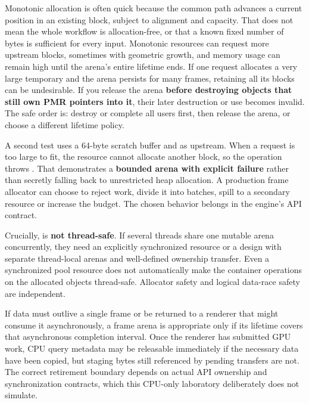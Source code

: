 Monotonic allocation is often quick because the common path advances a current position in an existing block, subject to alignment and capacity. That does not mean the whole workflow is allocation-free, or that a known fixed number of bytes is sufficient for every input. Monotonic resources can request more upstream blocks, sometimes with geometric growth, and memory usage can remain high until the arena's entire lifetime ends. If one request allocates a very large temporary and the arena persists for many frames, retaining all its blocks can be undesirable. If you release the arena \textbf{before destroying objects that still own PMR pointers into it}, their later destruction or use becomes invalid. The safe order is: destroy or complete all users first, then release the arena, or choose a different lifetime policy.

A second test uses a 64-byte scratch buffer and  as upstream. When a request is too large to fit, the resource cannot allocate another block, so the operation throws . That demonstrates a \textbf{bounded arena with explicit failure} rather than secretly falling back to unrestricted heap allocation. A production frame allocator can choose to reject work, divide it into batches, spill to a secondary resource or increase the budget. The chosen behavior belongs in the engine's API contract.

Crucially,  is \textbf{not thread-safe}. If several threads share one mutable arena concurrently, they need an explicitly synchronized resource or a design with separate thread-local arenas and well-defined ownership transfer. Even a synchronized pool resource does not automatically make the container operations on the allocated objects thread-safe. Allocator safety and logical data-race safety are independent.

If data must outlive a single frame or be returned to a renderer that might consume it asynchronously, a frame arena is appropriate only if its lifetime covers that asynchronous completion interval. Once the renderer has submitted GPU work, CPU query metadata may be releasable immediately if the necessary data have been copied, but staging bytes still referenced by pending transfers are not. The correct retirement boundary depends on actual API ownership and synchronization contracts, which this CPU-only laboratory deliberately does not simulate.

